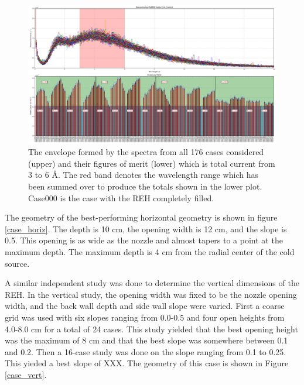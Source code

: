 \documentclass[preprint,12pt]{elsarticle}
\begin{document}
\begin{figure}
\begin{center}
\includegraphics[scale=0.26,trim={0cm 0cm 0cm 0cm},clip]{graphics/parametric_REH.pdf}
\end{center}
\caption{\label{parametric_REH}The envelope formed by the spectra from all 176 cases considered (upper) and their figures of merit (lower) which is total current from 3 to 6 \AA{}.  The red band denotes the wavelength range which has been summed over to produce the totals shown in the lower plot.  Case000 is the case with the REH completely filled.}
\end{figure}

The geometry of the best-performing horizontal geometry is shown in figure \ref{case_horiz}.  The depth is 10 cm, the opening width is 12 cm, and the slope is 0.5.  This opening is as wide as the nozzle and almost tapers to a point at the maximum depth.  The maximum depth is 4 cm from the radial center of the cold source. 

A similar independent study was done to determine the vertical dimensions of the REH.  In the vertical study, the opening width was fixed to be the nozzle opening width, and the back wall depth and side wall slope were varied.  First a coarse grid was used with six slopes ranging from 0.0-0.5 and four open heights from 4.0-8.0 cm for a total of 24 cases.  This study yielded that the best opening height was the maximum of 8 cm and that the best slope was somewhere between 0.1 and 0.2.  Then a 16-case study was done on the slope ranging from 0.1 to 0.25.  This yieded a best slope of XXX.  The geometry of this case is shown in Figure \ref{case_vert}.
\end{document}
